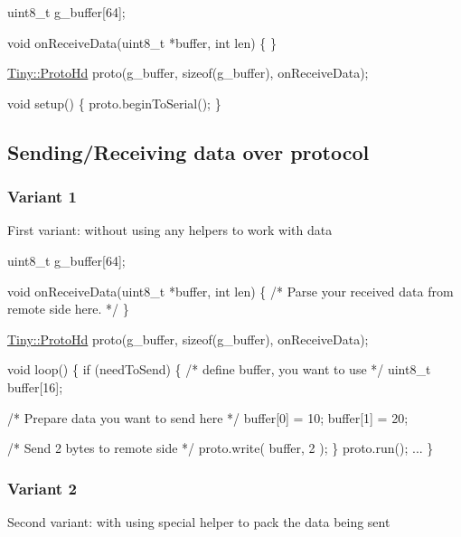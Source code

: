 \begin{DoxyCode}
uint8\_t g\_buffer[64];

\textcolor{keywordtype}{void} onReceiveData(uint8\_t *buffer, \textcolor{keywordtype}{int} len)
\{
\}

\hyperlink{classTiny_1_1ProtoHd}{Tiny::ProtoHd} proto(g\_buffer, \textcolor{keyword}{sizeof}(g\_buffer), onReceiveData);

\textcolor{keywordtype}{void} setup()
\{
    proto.beginToSerial();
\}
\end{DoxyCode}
\hypertarget{arduino_arduino_tiny_hd_send_receive}{}\subsection{Sending/\+Receiving data over protocol}\label{arduino_arduino_tiny_hd_send_receive}
\hypertarget{arduino_arduino_tiny_hd_send_receive1}{}\subsubsection{Variant 1}\label{arduino_arduino_tiny_hd_send_receive1}
First variant\+: without using any helpers to work with data 
\begin{DoxyCode}
uint8\_t g\_buffer[64];

\textcolor{keywordtype}{void} onReceiveData(uint8\_t *buffer, \textcolor{keywordtype}{int} len)
\{
    \textcolor{comment}{/* Parse your received data from remote side here. */}
\}

\hyperlink{classTiny_1_1ProtoHd}{Tiny::ProtoHd} proto(g\_buffer, \textcolor{keyword}{sizeof}(g\_buffer), onReceiveData);

\textcolor{keywordtype}{void} loop()
\{
    \textcolor{keywordflow}{if} (needToSend)
    \{
        \textcolor{comment}{/* define buffer, you want to use */}
        uint8\_t buffer[16];

        \textcolor{comment}{/* Prepare data you want to send here */}
        buffer[0] = 10;
        buffer[1] = 20;

        \textcolor{comment}{/* Send 2 bytes to remote side */}
        proto.write( buffer, 2 );
    \}
    proto.run();
    ...
\}
\end{DoxyCode}
\hypertarget{arduino_arduino_tiny_hd_send_receive2}{}\subsubsection{Variant 2}\label{arduino_arduino_tiny_hd_send_receive2}
Second variant\+: with using special helper to pack the data being sent 
